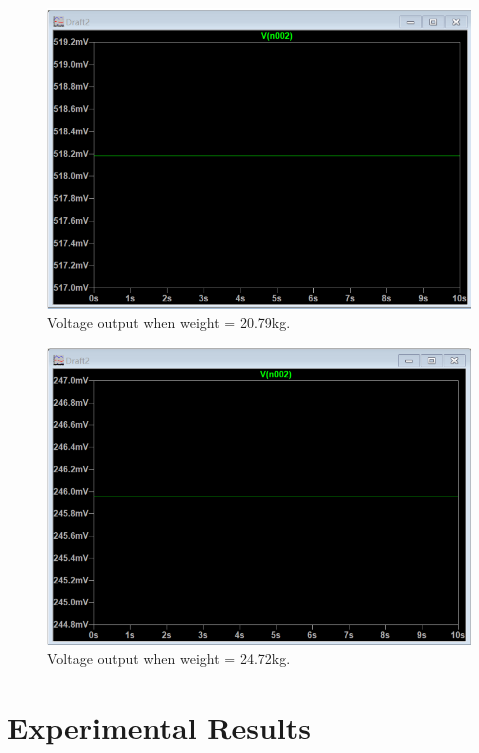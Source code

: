 \begin{figure}[h]
\centering
\includegraphics[width=\textwidth]{final-report/assets/20kg_sim.png}
\caption{Voltage output when weight = 20.79kg.}
\end{figure}

\begin{figure}[h]
\centering
\includegraphics[width=\textwidth]{final-report/assets/25kg_sim.png}
\caption{Voltage output when weight = 24.72kg.}
\end{figure}


\chapter{Experimental Results}

